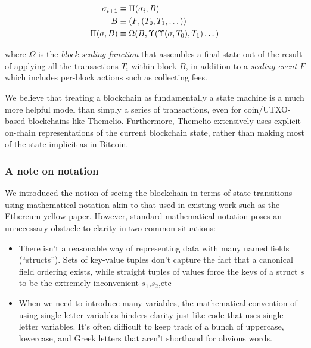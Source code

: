 \documentclass[
]{article}
\providecommand{\tightlist}{%
  \setlength{\itemsep}{0pt}\setlength{\parskip}{0pt}}
\begin{document}
\[
  \begin{aligned}
    \sigma_{i+1}  & \equiv \Pi(\sigma_i, B)                                     \newline \\
    B             & \equiv (F, (T_0,T_1,\dots))                      \newline            \\
    \Pi(\sigma,B) & \equiv \Omega(B, \Upsilon(\Upsilon(\sigma, T_0), T_1)\dots)
  \end{aligned}
\]

where \(\Omega\) is the \emph{block sealing function} that assembles a
final state out of the result of applying all the transactions \(T_i\)
within block \(B\), in addition to a \emph{sealing event} \(F\) which
includes per-block actions such as collecting fees.

We believe that treating a blockchain as fundamentally a state machine
is a much more helpful model than simply a series of transactions, even
for coin/UTXO-based blockchains like Themelio. Furthermore, Themelio
extensively uses explicit on-chain representations of the current
blockchain state, rather than making most of the state implicit as in
Bitcoin.

\hypertarget{a-note-on-notation}{%
  \subsubsection{A note on notation}\label{a-note-on-notation}}

We introduced the notion of seeing the blockchain in terms of state
transitions using mathematical notation akin to that used in existing
work such as the Ethereum yellow paper. However, standard mathematical
notation poses an unnecessary obstacle to clarity in two common
situations:

\begin{itemize}
  \tightlist
  \item
        There isn't a reasonable way of representing data with many named
        fields (``structs''). Sets of key-value tuples don't capture the fact
        that a canonical field ordering exists, while straight tuples of
        values force the keys of a struct \(s\) to be the extremely
        inconvenient \(s_1\),\(s_2\),etc
  \item
        When we need to introduce many variables, the mathematical convention
        of using single-letter variables hinders clarity just like code that
        uses single-letter variables. It's often difficult to keep track of a
        bunch of uppercase, lowercase, and Greek letters that aren't shorthand
        for obvious words.
\end{itemize}
\end{document}
